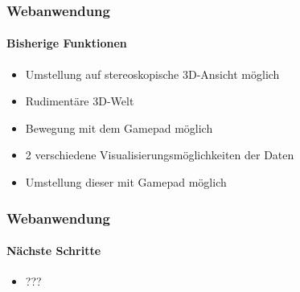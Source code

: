 \documentclass{beamer}
\begin{document}
\begin{frame}
\frametitle{Webanwendung}
\framesubtitle{Bisherige Funktionen}
\begin{itemize}
  \item Umstellung auf stereoskopische 3D-Ansicht m\"oglich
  \item Rudiment\"are 3D-Welt
  \item Bewegung mit dem Gamepad m\"oglich
  \item 2 verschiedene Visualisierungsm\"oglichkeiten der Daten
  \item Umstellung dieser mit Gamepad m\"oglich
\end{itemize}
\end{frame}

\begin{frame}
\frametitle{Webanwendung}
\framesubtitle{N\"achste Schritte}
\begin{itemize}
  \item ???
\end{itemize}
\end{frame}
\end{document}
